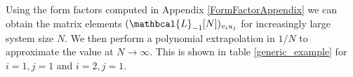 \documentclass[a4paper,10pt]{article}
\newcommand{\linnea}[1]{$\framebox{\tiny L}$\ \textbf{\texttt{{\color{red}\footnotesize#1}}}}
\newcommand{\jesper}[1]{$\framebox{\tiny J}$\ \textbf{\texttt{{\color{cyan}\footnotesize#1}}}}
\newcommand{\LnMat}[1]{\mathbcal{L}_{#1}}
\begin{document}
Using the form factors computed in Appendix \ref{FormFactorAppendix} we can obtain the matrix elements $(\LnMat{-1}[N])_{v_iu_j}$ for increasingly large system size $N$. We then perform a polynomial extrapolation in $1/N$ to approximate the value at $N\rightarrow\infty$. This is shown in  table \ref{generic_example} for $i=1,j=1$ and $i=2,j=1$. 
 



\end{document}
